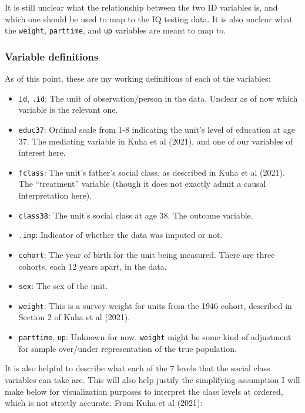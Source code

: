 \documentclass[
]{article}
\providecommand{\tightlist}{%
  \setlength{\itemsep}{0pt}\setlength{\parskip}{0pt}}
\begin{document}
It is still unclear what the relationship between the two ID variables
is, and which one should be used to map to the IQ testing data. It is
also unclear what the \texttt{weight}, \texttt{parttime}, and
\texttt{up} variables are meant to map to.

\subsubsection{Variable definitions}\label{variable-definitions}

As of this point, these are my working definitions of each of the
variables:

\begin{itemize}
\tightlist
\item
  \texttt{id}, \texttt{.id}: The unit of observation/person in the data.
  Unclear as of now which variable is the relevant one.
\item
  \texttt{educ37}: Ordinal scale from 1-8 indicating the unit's level of
  education at age 37. The mediating variable in Kuha et al (2021), and
  one of our variables of interest here.
\item
  \texttt{fclass}: The unit's father's social class, as described in
  Kuha et al (2021). The ``treatment'' variable (though it does not
  exactly admit a causal interpretation here).
\item
  \texttt{class38}: The unit's social class at age 38. The outcome
  variable.
\item
  \texttt{.imp}: Indicator of whether the data was imputed or not.
\item
  \texttt{cohort}: The year of birth for the unit being measured. There
  are three cohorts, each 12 years apart, in the data.
\item
  \texttt{sex}: The sex of the unit.
\item
  \texttt{weight}: This is a survey weight for units from the 1946
  cohort, described in Section 2 of Kuha et al (2021).
\item
  \texttt{parttime}, \texttt{up}: Unknown for now. \texttt{weight} might
  be some kind of adjustment for sample over/under representation of the
  true population.
\end{itemize}

It is also helpful to describe what each of the 7 levels that the social
class variables can take are. This will also help justify the
simplifying assumption I will make below for visualization purposes to
interpret the class levels at ordered, which is not strictly accurate.
From Kuha et al (2021):
\end{document}
